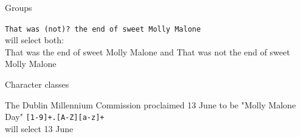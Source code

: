 \documentclass[handout]{beamer}
\begin{document}
\begin{frame}[fragile]{Groups}
	
	\lstinline{That was (not)? the end of sweet Molly Malone} \\ 
	will select both:   \\
	That was the end of sweet Molly Malone and That was not the end of sweet Molly Malone
		
	
\end{frame}


\begin{frame}[fragile]{Character classes}
	
	
	The Dublin Millennium Commission proclaimed 13 June to be "Molly Malone Day"
	\lstinline{[1-9]+.[A-Z][a-z]+} \\ 
	will select 13 June

	
	
\end{frame}


\end{document}
